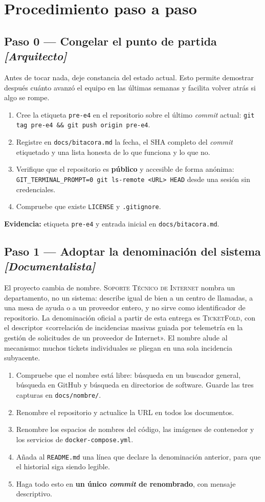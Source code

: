 \documentclass[11pt,a4paper]{article}
\newcommand{\paso}[1]{\subsection{#1}}
\begin{document}
	\section{Procedimiento paso a paso}
	
	\paso{Paso 0 --- Congelar el punto de partida \emph{[Arquitecto]}}
	
	Antes de tocar nada, deje constancia del estado actual. Esto permite demostrar después cuánto avanzó el equipo en las últimas semanas y facilita volver atrás si algo se rompe.
	
	\begin{enumerate}[leftmargin=*,itemsep=3pt]
		\item Cree la etiqueta \texttt{pre-e4} en el repositorio sobre el último \emph{commit} actual: \texttt{git tag pre-e4 \&\& git push origin pre-e4}.
		\item Registre en \texttt{docs/bitacora.md} la fecha, el SHA completo del \emph{commit} etiquetado y una lista honesta de lo que funciona y lo que no.
		\item Verifique que el repositorio es \textbf{público} y accesible de forma anónima: \texttt{GIT\_TERMINAL\_PROMPT=0 git ls-remote <URL> HEAD} desde una sesión sin credenciales.
		\item Compruebe que existe \texttt{LICENSE} y \texttt{.gitignore}.
	\end{enumerate}
	
	\textbf{Evidencia:} etiqueta \texttt{pre-e4} y entrada inicial en \texttt{docs/bitacora.md}.
	
	\paso{Paso 1 --- Adoptar la denominación del sistema \emph{[Documentalista]}}
	
	El proyecto cambia de nombre. \textsc{Soporte Técnico de Internet} nombra un departamento, no un sistema: describe igual de bien a un centro de llamadas, a una mesa de ayuda o a un proveedor entero, y no sirve como identificador de repositorio. La denominación oficial a partir de esta entrega es \textsc{TicketFold}, con el descriptor «correlación de incidencias masivas guiada por telemetría en la gestión de solicitudes de un proveedor de Internet». El nombre alude al mecanismo: muchos tickets individuales se pliegan en una sola incidencia subyacente.
	
	\begin{enumerate}[leftmargin=*,itemsep=3pt]
		\item Compruebe que el nombre está libre: búsqueda en un buscador general, búsqueda en GitHub y búsqueda en directorios de software. Guarde las tres capturas en \texttt{docs/nombre/}.
		\item Renombre el repositorio y actualice la URL en todos los documentos.
		\item Renombre los espacios de nombres del código, las imágenes de contenedor y los servicios de \texttt{docker-compose.yml}.
		\item Añada al \texttt{README.md} una línea que declare la denominación anterior, para que el historial siga siendo legible.
		\item Haga todo esto en \textbf{un único \emph{commit} de renombrado}, con mensaje descriptivo.
	\end{enumerate}
	
\end{document}
